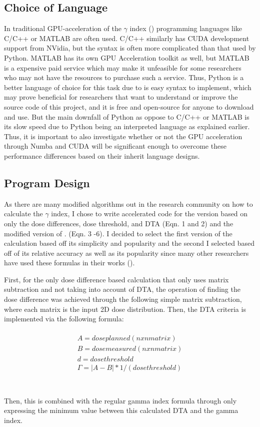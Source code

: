 \documentclass[12pt]{article}
\begin{document}
\subsection{Choice of Language}
In traditional GPU-acceleration of the $\gamma$ index (\textcite{Gu}) programming languages like C/C++ or MATLAB are often used. C/C++ similarly has CUDA development support from NVidia, but the syntax is often more complicated than that used by Python. MATLAB has its own GPU Acceleration toolkit as well, but MATLAB is a expensive paid service which may make it unfeasible for some researchers who may not have the resources to purchase such a service. Thus, Python is a better language of choice for this task due to is easy syntax to implement, which may prove beneficial for researchers that want to understand or improve the source code of this project, and it is free and open-source for anyone to download and use. But the main downfall of Python as oppose to C/C++ or MATLAB is its slow speed due to Python being an interpreted language as explained earlier. Thus, it is important to also investigate whether or not the GPU acceleration through Numba and CUDA will be significant enough to overcome these performance differences based on their inherit language designs.

\subsection{Program Design}
As there are many modified algorithms out in the research community on how to calculate the $\gamma$ index, I chose to write accelerated code for the version based on only the dose differences, dose threshold, and DTA (Eqn. 1 and 2) and the modified version of \textcite{Low}. (Eqn. 3 -6). I decided to select the first version of the calculation based off its simplicity and popularity and the second I selected based off of its relative accuracy as well as its popularity since many other researchers have used these formulas in their works (\textcite{Gu}).

First, for the only dose difference based calculation that only uses matrix subtraction and not taking into account of DTA, the operation of finding the dose difference was achieved through the following simple matrix subtraction, where each matrix is the input 2D dose distribution. Then, the DTA criteria is implemented via the following formula:
\\
\\
\begin{align}
  A = dose planned (nxn matrix) \\
  B = dose measured (nxn matrix) \\
  d = dose threshold \\
  \Gamma = |A - B| * 1 / (dose threshold) \\
\end{align}
\\
\\
Then, this is combined with the regular gamma index formula through only expressing the minimum value between this calculated DTA and the gamma index.
\end{document}
